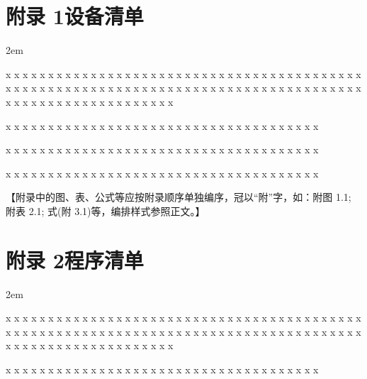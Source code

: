 \clearpage
{}
{}

\begingroup
    \section*{附录 1\hspace{1em}设备清单}

    \songti
    \setlength{\baselineskip}{25pt}
    \setlength{\parskip}{0pt}
    \parindent 2em
    
    x x x x x x x x x x x x x x x x x x x x x x x x x x x x x x x x x x x x x x x x x x x x x x x x x x x x x x x x x x x x x x x x x x x x x x x x x x x x x x x x x x x x x x x x x x x x x x x x x x x x x x x x

    x x x x x x x x x x x x x x x x x x x x x x x x x x x x x x x x x x x x x

    x x x x x x x x x x x x x x x x x x x x x x x x x x x x x x x x x x x x x

    x x x x x x x x x x x x x x x x x x x x x x x x x x x x x x x x x x x x x
    \par
\endgroup

\begingroup
    \songti\color{red}
    \noindent 【附录中的图、表、公式等应按附录顺序单独编序，冠以“附”字，如：附图 1.1; 附表 2.1; 式(附 3.1)等，编排样式参照正文。】
    \par
\endgroup

\clearpage
{}
{}

\begingroup
    \section*{附录 2\hspace{1em}程序清单}

    \songti
    \setlength{\baselineskip}{25pt}
    \setlength{\parskip}{0pt}
    \parindent 2em
    
    x x x x x x x x x x x x x x x x x x x x x x x x x x x x x x x x x x x x x x x x x x x x x x x x x x x x x x x x x x x x x x x x x x x x x x x x x x x x x x x x x x x x x x x x x x x x x x x x x x x x x x x x

    x x x x x x x x x x x x x x x x x x x x x x x x x x x x x x x x x x x x x
    \par
\endgroup
